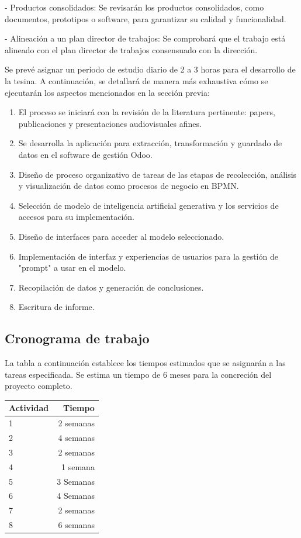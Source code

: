 \documentclass[12pt]{article}
\begin{document}
- Productos consolidados: Se revisarán los productos consolidados, como documentos, prototipos o software, para garantizar su calidad y funcionalidad.

- Alineación a un plan director de trabajos: Se comprobará que el trabajo está alineado con el plan director de trabajos consensuado con la dirección.

Se prevé asignar un período de estudio diario de 2 a 3 horas para el desarrollo de la tesina. A continuación, se detallará de manera más exhaustiva cómo se ejecutarán los aspectos mencionados en la sección previa:

\begin{enumerate}
    \item El proceso se iniciará con la revisión de la literatura pertinente: papers, publicaciones y presentaciones audiovisuales afines.
    \item Se desarrolla la aplicación para extracción, transformación y guardado de datos en el software de gestión Odoo.
    \item Diseño de proceso organizativo de tareas de las etapas de recolección, análisis y visualización de datos como procesos de negocio en BPMN.
    \item Selección de modelo de inteligencia artificial generativa y los servicios de accesos para su implementación.
    \item Diseño de interfaces para acceder al modelo seleccionado.
    \item Implementación de interfaz y experiencias de usuarios para la gestión de  "prompt" a usar en el modelo.
    \item Recopilación de datos y generación de conclusiones.
    \item Escritura de informe.
\end{enumerate}


\subsection{Cronograma de trabajo}

La tabla a continuación establece los tiempos estimados que se asignarán a las tareas especificada.
Se estima un tiempo de 6 meses para la concreción del proyecto completo.


\begin{table}[H]
    \centering
    \begin{tabular}{|l|r|} \hline 
         Actividad& Tiempo\\ \hline 
         1& 2 semanas\\ \hline 
         2& 4 semanas\\ \hline 
         3& 2 semanas\\ \hline 
         4& 1 semana\\ \hline 
         5& 3 Semanas\\ \hline 
         6& 4 Semanas\\ \hline 
         7& 2 semanas\\ \hline 
         8& 6 semanas\\ \hline
    \end{tabular}
    \label{tab:my_label}
\end{table}

\end{document}
